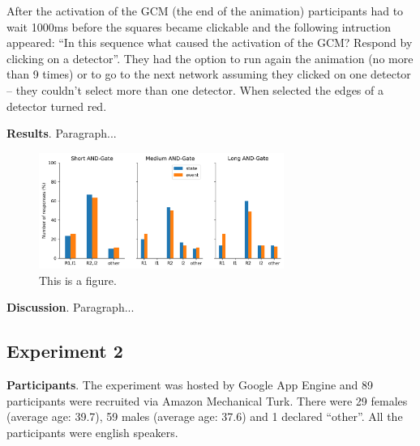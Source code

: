 \documentclass[10pt,letterpaper]{article}
\begin{document}
After the activation of the GCM (the end of the animation) participants had to wait 1000ms before the squares became clickable and the following intruction appeared: ``In this sequence what caused the activation of the GCM? Respond by clicking on a detector''. They had the option to run again the animation (no more than 9 times) or to go to the next network assuming they clicked on one detector -- they couldn't select more than one detector. When selected the edges of a detector turned red.

\textbf{Results}. Paragraph...

\begin{figure}[ht]
\begin{center}
\includegraphics[width=8cm]{results_E1}
\end{center}
\caption{This is a figure.} 
\label{fig:2}
\end{figure}

\textbf{Discussion}. Paragraph...

\subsection{Experiment 2}

\textbf{Participants}. The experiment was hosted by Google App Engine and 89 participants were recruited via Amazon Mechanical Turk. There were 29 females (average age: 39.7), 59 males (average age: 37.6) and 1 declared ``other''. All the participants were english speakers.
\end{document}
